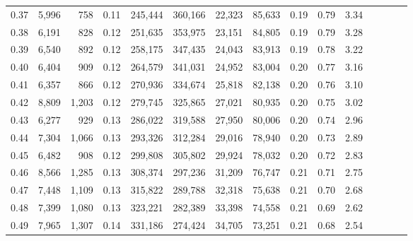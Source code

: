 \begin{tabular}{rrrcrrrrrrrrrrr}
0.37 &   5,996 &     758 &                                       0.11 &  245,444 &  360,166 &   22,323 &   85,633 &  0.19 &  0.79 &                         3.34 \\
0.38 &   6,191 &     828 &                                       0.12 &  251,635 &  353,975 &   23,151 &   84,805 &  0.19 &  0.79 &                         3.28 \\
0.39 &   6,540 &     892 &                                       0.12 &  258,175 &  347,435 &   24,043 &   83,913 &  0.19 &  0.78 &                         3.22 \\
0.40 &   6,404 &     909 &                                       0.12 &  264,579 &  341,031 &   24,952 &   83,004 &  0.20 &  0.77 &                         3.16 \\
0.41 &   6,357 &     866 &                                       0.12 &  270,936 &  334,674 &   25,818 &   82,138 &  0.20 &  0.76 &                         3.10 \\
0.42 &   8,809 &   1,203 &                                       0.12 &  279,745 &  325,865 &   27,021 &   80,935 &  0.20 &  0.75 &                         3.02 \\
0.43 &   6,277 &     929 &                                       0.13 &  286,022 &  319,588 &   27,950 &   80,006 &  0.20 &  0.74 &                         2.96 \\
0.44 &   7,304 &   1,066 &                                       0.13 &  293,326 &  312,284 &   29,016 &   78,940 &  0.20 &  0.73 &                         2.89 \\
0.45 &   6,482 &     908 &                                       0.12 &  299,808 &  305,802 &   29,924 &   78,032 &  0.20 &  0.72 &                         2.83 \\
0.46 &   8,566 &   1,285 &                                       0.13 &  308,374 &  297,236 &   31,209 &   76,747 &  0.21 &  0.71 &                         2.75 \\
0.47 &   7,448 &   1,109 &                                       0.13 &  315,822 &  289,788 &   32,318 &   75,638 &  0.21 &  0.70 &                         2.68 \\
0.48 &   7,399 &   1,080 &                                       0.13 &  323,221 &  282,389 &   33,398 &   74,558 &  0.21 &  0.69 &                         2.62 \\
0.49 &   7,965 &   1,307 &                                       0.14 &  331,186 &  274,424 &   34,705 &   73,251 &  0.21 &  0.68 &                         2.54 \\

\end{tabular}
